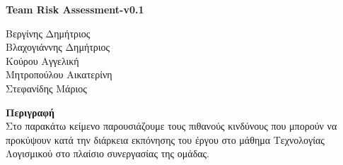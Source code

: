 \documentclass{article}
\begin{document}
\begin{titlepage}
   \begin{center}
       \vspace*{1cm}

           \textbf{\LARGE{Team Risk Assessment-v0.1}}

       \vspace{0.5cm}
        
            
       \vspace{2cm}
        
       \large{Βεργίνης Δημήτριος}\\
       \large{Βλαχογιάννης Δημήτριος}\\
       \large{Κούρου Αγγελική} \\
       \large{Μητροπούλου Αικατερίνη} \\
       \large{Στεφανίδης Μάριος}\\
      \vspace{1.5cm}
   \end{center}
   \textbf{Περιγραφή}\\
   Στο παρακάτω κείμενο παρουσιάζουμε τους πιθανούς κινδύνους που μπορούν να προκύψουν κατά την διάρκεια εκπόνησης του έργου στο μάθημα Τεχνολογίας Λογισμικού στο πλαίσιο συνεργασίας της ομάδας.
   
\end{titlepage}
\end{document}
